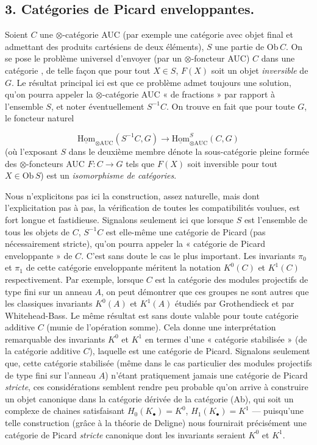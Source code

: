 \documentclass[11pt,a4paper]{article}
\begin{document}
\subsection*{3. Catégories de Picard enveloppantes.}

Soient $C$ une $\otimes$-catégorie AUC (par exemple une catégorie avec
objet final et admettant des produits cartésiens de deux éléments), $S$ une
partie de $\mathrm{Ob}\, C$. On se pose le problème universel d'envoyer (par
un $\otimes$-foncteur AUC) $C$ dans une \supplied{$\otimes$-}catégorie 
\struck{\ill{}} , de telle façon que pour tout $X \in S$, $F(X)$
soit un objet \emph{inversible} de $G$. Le résultat principal ici est que ce
problème admet toujours une solution, qu'on pourra appeler la
$\otimes$-catégorie AUC « de fractions » par rapport à l'ensemble $S$, et
noter éventuellement $S^{-1}C$. On trouve en fait que pour toute $G$, le
foncteur naturel

\[ \underline{\mathrm{Hom}}_{\otimes \mathrm{AUC}}(S^{-1}C, G)
   \longrightarrow \underline{\mathrm{Hom}}^{S}_{\otimes \mathrm{AUC}}(C, G) \]
(où l'exposant $S$ dans le deuxième membre dénote la sous-catégorie pleine
formée des $\otimes$-foncteurs AUC $F : C \to G$ tels que $F(X)$ soit
inversible pour tout $X \in \mathrm{Ob}\, S$) est un \emph{isomorphisme de
catégories}.

Nous n'explicitons pas ici la construction, assez naturelle, mais dont
l'explicitation pas à pas,   la vérification de toutes
les compatibilités voulues, est fort longue et fastidieuse. Signalons
seulement ici que lorsque $S$ est l'ensemble de tous les objets de $C$,
$S^{-1}C$ est elle-même une catégorie de Picard (pas nécessairement
stricte), qu'on pourra appeler la « catégorie de Picard enveloppante » de
$C$. C'est sans doute le cas le plus important. Les invariants $\pi_0$ et
$\pi_1$ de cette catégorie enveloppante méritent la notation $K^0(C)$ et
$K^1(C)$ respectivement. Par exemple, lorsque $C$ est la catégorie des
modules projectifs de type fini sur un anneau $A$,  on peut démontrer que ces groupes ne sont autres que les classiques
invariants $K^0(A)$ et $K^1(A)$ étudiés par Grothendieck et par
Whitehead-Bass. Le même résultat est sans doute valable pour toute catégorie
additive $C$ (munie de l'opération somme). Cela donne une interprétation
remarquable des invariants $K^0$ et $K^1$ en termes d'une « catégorie
stabilisée » (de la catégorie additive $C$), laquelle est une catégorie de
Picard. Signalons seulement que, cette catégorie stabilisée (même dans le
cas particulier des modules projectifs de type fini sur l'anneau $A$)
n'étant pratiquement jamais une catégorie de Picard \emph{stricte}, ces
considérations semblent rendre peu probable qu'on arrive à construire un
objet canonique dans la catégorie dérivée de la catégorie (Ab), qui soit un
complexe de chaines satisfaisant $H_0(K_{\bullet}) = K^0$,
$H_1(K_{\bullet}) = K^1$ --- puisqu'une telle construction (grâce à la
théorie de Deligne) nous fournirait précisément une catégorie de Picard
\emph{stricte} canonique dont les invariants seraient $K^0$ et $K^1$.
\end{document}

